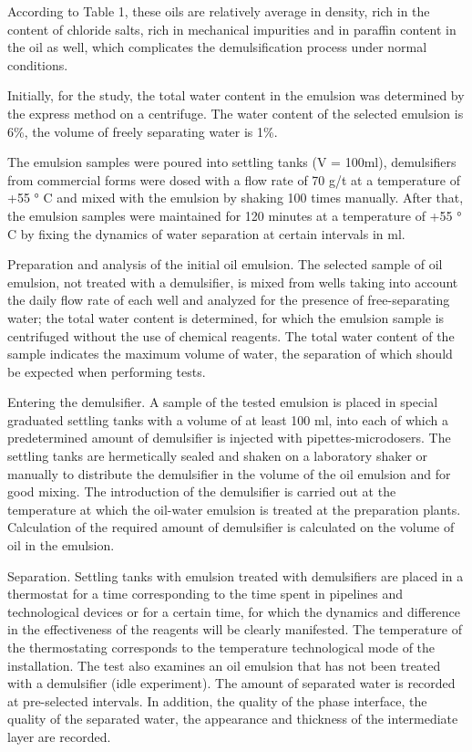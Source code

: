 \begin{multicols}{2}
According to Table 1, these oils are relatively average in density, rich
in the content of chloride salts, rich in mechanical impurities and in
paraffin content in the oil as well, which complicates the
demulsification process under normal conditions.

Initially, for the study, the total water content in the emulsion was
determined by the express method on a centrifuge. The water content of
the selected emulsion is 6\%, the volume of freely separating water is
1\%.

The emulsion samples were poured into settling tanks (V = 100ml),
demulsifiers from commercial forms were dosed with a flow rate of 70 g/t
at a temperature of +55 ° C and mixed with the emulsion by shaking 100
times manually. After that, the emulsion samples were maintained for 120
minutes at a temperature of +55 ° C by fixing the dynamics of water
separation at certain intervals in ml.

Preparation and analysis of the initial oil emulsion. The selected
sample of oil emulsion, not treated with a demulsifier, is mixed from
wells taking into account the daily flow rate of each well and analyzed
for the presence of free-separating water; the total water content is
determined, for which the emulsion sample is centrifuged without the use
of chemical reagents. The total water content of the sample indicates
the maximum volume of water, the separation of which should be expected
when performing tests.

Entering the demulsifier. A sample of the tested emulsion is placed in
special graduated settling tanks with a volume of at least 100 ml, into
each of which a predetermined amount of demulsifier is injected with
pipettes-microdosers. The settling tanks are hermetically sealed and
shaken on a laboratory shaker or manually to distribute the demulsifier
in the volume of the oil emulsion and for good mixing. The introduction
of the demulsifier is carried out at the temperature at which the
oil-water emulsion is treated at the preparation plants. Calculation of
the required amount of demulsifier is calculated on the volume of oil in
the emulsion.

Separation. Settling tanks with emulsion treated with demulsifiers are
placed in a thermostat for a time corresponding to the time spent in
pipelines and technological devices or for a certain time, for which the
dynamics and difference in the effectiveness of the reagents will be
clearly manifested. The temperature of the thermostating corresponds to
the temperature technological mode of the installation. The test also
examines an oil emulsion that has not been treated with a demulsifier
(idle experiment). The amount of separated water is recorded at
pre-selected intervals. In addition, the quality of the phase interface,
the quality of the separated water, the appearance and thickness of the
intermediate layer are recorded.


\end{multicols}
